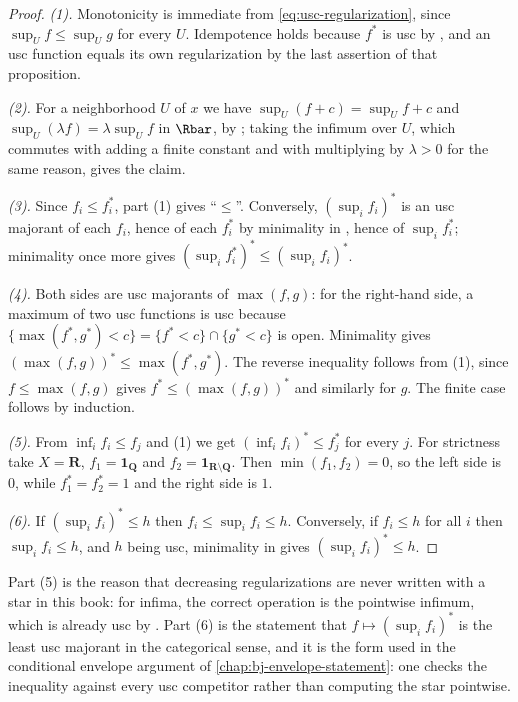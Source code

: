 \begin{proof}
\emph{(1).}  Monotonicity is immediate from \eqref{eq:usc-regularization},
since $\sup_Uf\leq\sup_Ug$ for every $U$.  Idempotence holds because $f^*$ is
usc by , and an usc function equals its own
regularization by the last assertion of that proposition.

\emph{(2).}  For a neighborhood $U$ of $x$ we have
$\sup_U(f+c)=\sup_Uf+c$ and $\sup_U(\lambda f)=\lambda\sup_Uf$ in $\Rbar$,
by ; taking the infimum over $U$, which
commutes with adding a finite constant and with multiplying by $\lambda>0$
for the same reason, gives the claim.

\emph{(3).}  Since $f_i\leq f_i^*$, part (1) gives ``$\leq$''.  Conversely,
$(\sup_if_i)^*$ is an usc majorant of each $f_i$, hence of each $f_i^*$ by
minimality in , hence of $\sup_if_i^*$; minimality
once more gives $(\sup_if_i^*)^*\leq(\sup_if_i)^*$.

\emph{(4).}  Both sides are usc majorants of $\max(f,g)$: for the right-hand
side, a maximum of two usc functions is usc because
$\{\max(f^*,g^*)<c\}=\{f^*<c\}\cap\{g^*<c\}$ is open.  Minimality gives
$(\max(f,g))^*\leq\max(f^*,g^*)$.  The reverse inequality follows from (1),
since $f\leq\max(f,g)$ gives $f^*\leq(\max(f,g))^*$ and similarly for $g$.
The finite case follows by induction.

\emph{(5).}  From $\inf_if_i\leq f_j$ and (1) we get
$(\inf_if_i)^*\leq f_j^*$ for every $j$.  For strictness take $X=\mathbf R$,
$f_1=\mathbf 1_{\mathbf Q}$ and $f_2=\mathbf 1_{\mathbf R\setminus\mathbf Q}$.
Then $\min(f_1,f_2)=0$, so the left side is $0$, while $f_1^*=f_2^*=1$ and the
right side is $1$.

\emph{(6).}  If $(\sup_if_i)^*\leq h$ then $f_i\leq\sup_if_i\leq h$.
Conversely, if $f_i\leq h$ for all $i$ then $\sup_if_i\leq h$, and $h$ being
usc, minimality in  gives $(\sup_if_i)^*\leq h$.
\end{proof}

\begin{remark}
\label{rem:usc-star-not-lattice}
Part (5) is the reason that decreasing regularizations are never written with
a star in this book: for infima, the correct operation is the pointwise
infimum, which is already usc by .  Part (6) is the
statement that $f\mapsto(\sup_i f_i)^*$ is the least usc majorant in the
categorical sense, and it is the form used in the conditional envelope
argument of \cref{chap:bj-envelope-statement}: one checks the inequality
against every usc competitor rather than computing the star pointwise.
\end{remark}

